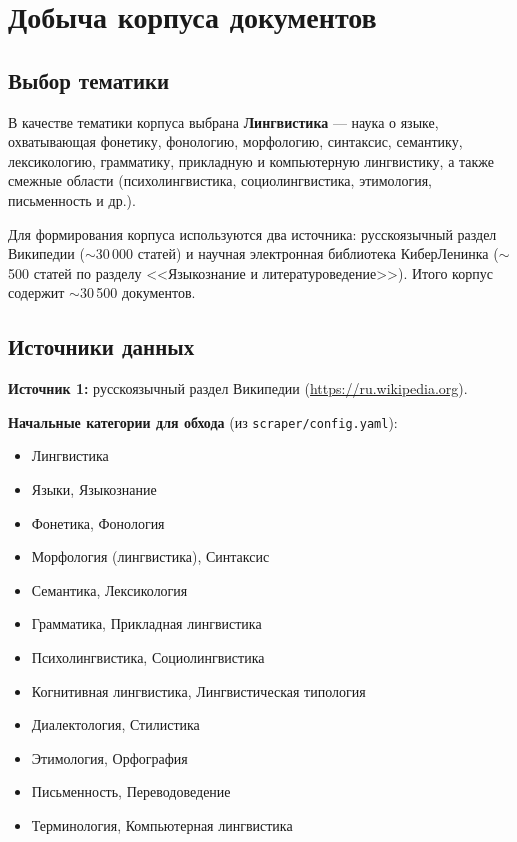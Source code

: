 \section{Добыча корпуса документов}

\subsection{Выбор тематики}

В качестве тематики корпуса выбрана \textbf{Лингвистика} --- наука о языке, охватывающая фонетику, фонологию, морфологию, синтаксис, семантику, лексикологию, грамматику, прикладную и компьютерную лингвистику, а также смежные области (психолингвистика, социолингвистика, этимология, письменность и др.).

Для формирования корпуса используются два источника: русскоязычный раздел Википедии ($\sim$30\,000 статей) и научная электронная библиотека КиберЛенинка ($\sim$500 статей по разделу <<Языкознание и литературоведение>>). Итого корпус содержит $\sim$30\,500 документов.

\subsection{Источники данных}

\textbf{Источник 1:} русскоязычный раздел Википедии (\url{https://ru.wikipedia.org}).

\textbf{Начальные категории для обхода} (из \texttt{scraper/config.yaml}):
\begin{itemize}
    \item Лингвистика
    \item Языки, Языкознание
    \item Фонетика, Фонология
    \item Морфология (лингвистика), Синтаксис
    \item Семантика, Лексикология
    \item Грамматика, Прикладная лингвистика
    \item Психолингвистика, Социолингвистика
    \item Когнитивная лингвистика, Лингвистическая типология
    \item Диалектология, Стилистика
    \item Этимология, Орфография
    \item Письменность, Переводоведение
    \item Терминология, Компьютерная лингвистика
\end{itemize}

